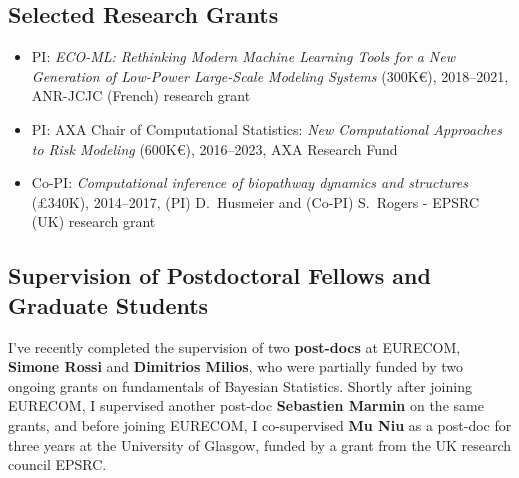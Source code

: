 \documentclass[oneside, a4paper, onecolumn, 10pt]{article}
\begin{document}
\subsection*{Selected Research Grants}
\begin{itemize}
  \item PI: \emph{ECO-ML: Rethinking Modern Machine Learning Tools for a New Generation of Low-Power Large-Scale Modeling Systems} (300K\euro), 2018--2021, ANR-JCJC (French) research grant
  \item PI: AXA Chair of Computational Statistics: \emph{New Computational Approaches to Risk Modeling} (600K\euro), 2016--2023, AXA Research Fund 
  \item Co-PI: \emph{Computational inference of biopathway dynamics and structures} (\pounds 340K), 2014--2017, (PI) D.~Husmeier and (Co-PI) S.~Rogers - EPSRC (UK) research grant 
\end{itemize}



\subsection*{Supervision of Postdoctoral Fellows and Graduate Students}

I've recently completed the supervision of two {\bf post-docs} at EURECOM, {\bf Simone Rossi} and {\bf Dimitrios Milios}, who were partially funded by two ongoing grants on fundamentals of Bayesian Statistics.
Shortly after joining EURECOM, I supervised another post-doc {\bf Sebastien Marmin} on the same grants, and before joining EURECOM, I co-supervised {\bf Mu Niu} as a post-doc for three years at the University of Glasgow, funded by a grant from the UK research council EPSRC. 
\end{document}
